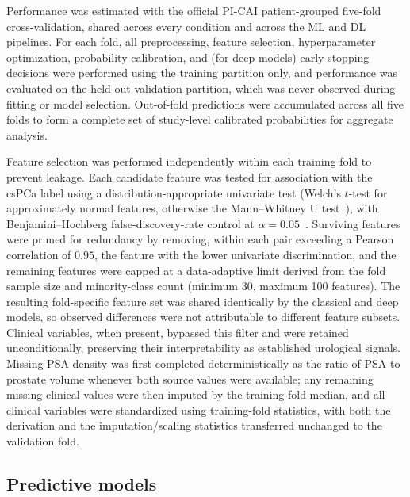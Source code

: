 \documentclass[11pt]{article}
\begin{document}
Performance was estimated with the official PI-CAI patient-grouped five-fold
cross-validation, shared across every condition and across the ML and DL
pipelines. For each fold, all preprocessing, feature selection, hyperparameter
optimization, probability calibration, and (for deep models) early-stopping
decisions were performed using the training partition only, and performance was
evaluated on the held-out validation partition, which was never observed during
fitting or model selection. Out-of-fold predictions were accumulated across all
five folds to form a complete set of study-level calibrated probabilities for
aggregate analysis.

Feature selection was performed independently within each training fold to
prevent leakage. Each candidate feature was tested for association with the
csPCa label using a distribution-appropriate univariate test (Welch's $t$-test
for approximately normal features, otherwise the Mann--Whitney U
test~\citep{mann1947test}), with Benjamini--Hochberg false-discovery-rate
control at $\alpha = 0.05$~\citep{benjamini1995controlling}. Surviving features
were pruned for redundancy by removing, within each pair exceeding a Pearson
correlation of $0.95$, the feature with the lower univariate discrimination, and
the remaining features were capped at a data-adaptive limit derived from the
fold sample size and minority-class count (minimum 30, maximum 100 features).
The resulting fold-specific feature set was shared identically by the classical
and deep models, so observed differences were not attributable to different
feature subsets. Clinical variables, when present, bypassed this
filter and were retained unconditionally, preserving their interpretability as
established urological signals. Missing PSA density was first completed
deterministically as the ratio of PSA to prostate volume whenever both source
values were available; any remaining missing clinical values were then imputed by
the training-fold median, and all clinical variables were standardized using
training-fold statistics, with both the derivation and the imputation/scaling
statistics transferred unchanged to the validation fold.

\subsection{Predictive models}
\label{sec:models}
\end{document}
